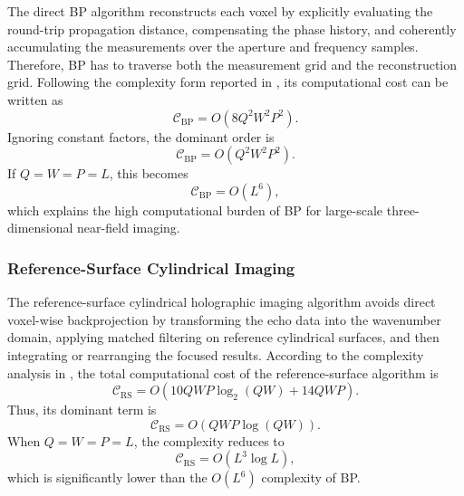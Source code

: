 \documentclass[journal]{IEEEtran}
\begin{document}
The direct BP algorithm reconstructs each voxel by explicitly evaluating the round-trip propagation distance, compensating the phase history, and coherently accumulating the measurements over the aperture and frequency samples. Therefore, BP has to traverse both the measurement grid and the reconstruction grid. Following the complexity form reported in \cite{Tan2024CylindricalHolography}, its computational cost can be written as
\begin{equation}
    \mathcal{C}_{\mathrm{BP}}
    = O\left(8Q^2W^2P^2\right).
\end{equation}
Ignoring constant factors, the dominant order is
\begin{equation}
    \mathcal{C}_{\mathrm{BP}}
    = O\left(Q^2W^2P^2\right).
\end{equation}
If $Q=W=P=L$, this becomes
\begin{equation}
    \mathcal{C}_{\mathrm{BP}} = O\left(L^6\right),
\end{equation}
which explains the high computational burden of BP for large-scale three-dimensional near-field imaging.

\subsubsection{Reference-Surface Cylindrical Imaging}

The reference-surface cylindrical holographic imaging algorithm avoids direct voxel-wise backprojection by transforming the echo data into the wavenumber domain, applying matched filtering on reference cylindrical surfaces, and then integrating or rearranging the focused results. According to the complexity analysis in \cite{Tan2024CylindricalHolography}, the total computational cost of the reference-surface algorithm is
\begin{equation}
    \mathcal{C}_{\mathrm{RS}}
    = O\left(10QWP\log_2(QW)+14QWP\right).
\end{equation}
Thus, its dominant term is
\begin{equation}
    \mathcal{C}_{\mathrm{RS}}
    = O\left(QWP\log(QW)\right).
\end{equation}
When $Q=W=P=L$, the complexity reduces to
\begin{equation}
    \mathcal{C}_{\mathrm{RS}}
    = O\left(L^3\log L\right),
\end{equation}
which is significantly lower than the $O(L^6)$ complexity of BP.
\end{document}
